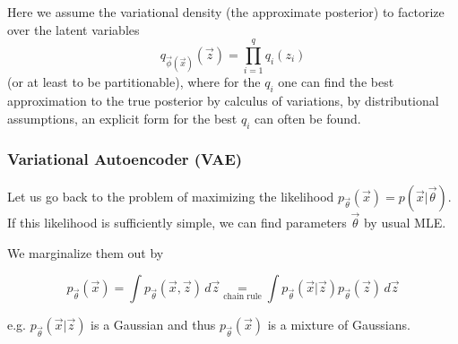 Here we assume the variational density (the approximate posterior) to factorize over the latent variables
\begin{equation}
    q_{\vec{\phi}(\vec{x})}(\vec{z}) = \prod_{i=1}^{q} q_i(z_i)
\end{equation}
(or at least to be partitionable), where for the $q_i$ one can find
the best approximation to the true posterior by calculus of variations,
by distributional assumptions, an explicit form for the best $q_i$ can
often be found.

\subsubsection{Variational Autoencoder (VAE)}



Let us go back to the problem of maximizing the likelihood
$p_\vec{\theta}(\vec{x}) = p(\vec{x}|\vec{\theta})$.
If this likelihood is sufficiently simple, we can find 
parameters $\vec{\theta}$ by usual MLE.


We marginalize them out by

\begin{equation}
    p_\vec{\theta}(\vec{x}) = \int p_\vec{\theta}(\vec{x},\vec{z}) \, d\vec{z} \underset{\text{chain rule}}{=} \int p_\vec{\theta}(\vec{x}|\vec{z}) p_\vec{\theta}(\vec{z}) \, d\vec{z}
\end{equation}

e.g. $p_\vec{\theta}(\vec{x}|\vec{z})$ is a Gaussian and thus $p_\vec{\theta}(\vec{x})$ is a mixture of Gaussians.


